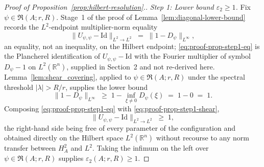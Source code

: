 \documentclass[pdflatex,sn-basic,Numbered]{sn-jnl}
\theoremstyle{thmstyleone}%
\theoremstyle{thmstylethree}%
\begin{document}
\begin{proof}[Proof of Proposition~\ref{prop:hilbert-resolution}.]
	\medskip
	\emph{Step 1: Lower bound $\varepsilon_2 \ge 1$.}
	Fix $\psi \in \mathfrak{R}(A; r, R)$. Stage~1 of the proof of
	Lemma~\ref{lem:diagonal-lower-bound} records the $L^2$-endpoint
	multiplier-norm equality
	\begin{equation}\label{eq:proof-prop-step1-eq}
		\bigl\| U_{\psi, \psi} - \mathrm{Id} \bigr\|_{L^2 \to L^2}
		\;=\; \bigl\| 1 - D_\psi \bigr\|_{L^\infty} ,
	\end{equation}
	an equality, not an inequality, on the Hilbert endpoint;
	\eqref{eq:proof-prop-step1-eq} is the Plancherel identification of
	$U_{\psi, \psi} - \mathrm{Id}$ with the Fourier multiplier of
	symbol $D_\psi - 1$ on $L^2(\mathbb{R}^n)$, supplied in Section~2 and not re-derived here.
	Lemma~\ref{lem:shear_covering}, applied to
	$\psi \in \mathfrak{R}(A; r, R)$ under the spectral threshold
	$|\lambda| > R/r$, supplies the lower bound
	\begin{equation}\label{eq:proof-prop-step1-shear}
		\bigl\| 1 - D_\psi \bigr\|_{L^\infty}
		\;\ge\; 1 - \inf_{\xi \neq 0} D_\psi(\xi)
		\;=\; 1 - 0
		\;=\; 1 .
	\end{equation}
	Composing \eqref{eq:proof-prop-step1-eq} with
	\eqref{eq:proof-prop-step1-shear},
	\begin{equation}\label{eq:proof-prop-step1}
		\bigl\| U_{\psi, \psi} - \mathrm{Id} \bigr\|_{L^2 \to L^2}
		\;\ge\; 1 ,
	\end{equation}
	the right-hand side being free of every parameter of the
	configuration and obtained directly on the Hilbert space
	$L^2(\mathbb{R}^n)$ without recourse to any norm transfer between
	$H^2_A$ and $L^2$. Taking the infimum on the left over
	$\psi \in \mathfrak{R}(A; r, R)$ supplies
	$\varepsilon_2(A; r, R) \ge 1$.
	

\end{proof}
\end{document}
